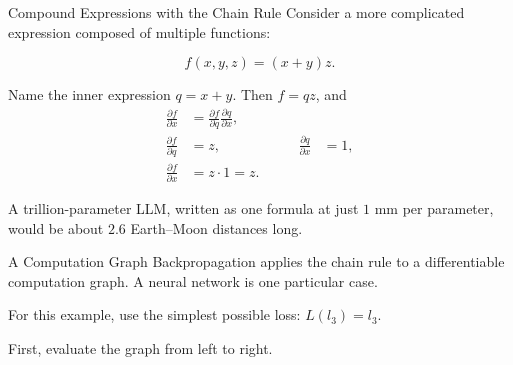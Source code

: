 \documentclass[aspectratio=169]{beamer}
\begin{document}
\begin{frame}{Compound Expressions with the Chain Rule}
  Consider a more complicated expression composed of multiple functions:

  \begin{equation*}
    f(x,y,z)=(x+y)z.
  \end{equation*}

  Name the inner expression $q=x+y$. Then $f=qz$, and
  \begin{align*}
    \frac{\partial f}{\partial x}
    &= \frac{\partial f}{\partial q}
    \frac{\partial q}{\partial x}, \\
    \frac{\partial f}{\partial q} &= z,
    &\qquad
    \frac{\partial q}{\partial x} &= 1, \\
    \frac{\partial f}{\partial x}
    &= z \cdot 1 = z.
  \end{align*}

  \vfill
  {\footnotesize
    A trillion-parameter LLM, written as one formula at just $1$ mm per
    parameter, would be about $2.6$ Earth--Moon distances long.
  }
\end{frame}

\begin{frame}{A Computation Graph}
  Backpropagation applies the chain rule to a differentiable computation
  graph. A neural network is one particular case.

  For this example, use the simplest possible loss: $L(l_3)=l_3$.

  \centering

  \vspace{0.5em}
  First, evaluate the graph from left to right.
\end{frame}
\end{document}
